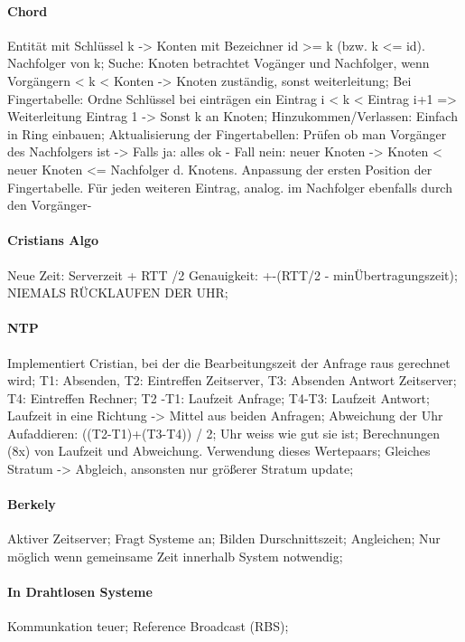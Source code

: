 \documentclass[pagesize,11pt,a4paper]{scrartcl}
\begin{document}
\paragraph{Chord}
	Entität mit Schlüssel k -> Konten mit Bezeichner id >= k (bzw. k <= id). Nachfolger von k;
	Suche: Knoten betrachtet Vogänger und Nachfolger, wenn Vorgängern < k < Konten -> Knoten zuständig, sonst weiterleitung;
	Bei Fingertabelle: Ordne Schlüssel bei einträgen ein Eintrag i < k < Eintrag i+1 => Weiterleitung Eintrag 1 -> Sonst k an Knoten;
	Hinzukommen/Verlassen: Einfach in Ring einbauen; Aktualisierung der Fingertabellen: Prüfen ob man Vorgänger des Nachfolgers ist ->
		Falls ja: alles ok -
		Fall nein: neuer Knoten -> Knoten < neuer Knoten <= Nachfolger d. Knotens. Anpassung der ersten Position der Fingertabelle. Für jeden weiteren Eintrag, analog. im Nachfolger ebenfalls durch den Vorgänger-

\paragraph*{Cristians Algo}
	Neue Zeit: Serverzeit + RTT /2  Genauigkeit: +-(RTT/2 - minÜbertragungszeit);
	NIEMALS RÜCKLAUFEN DER UHR;

\paragraph*{NTP}
	Implementiert Cristian, bei der die Bearbeitungszeit der Anfrage raus gerechnet wird;
	T1: Absenden, T2: Eintreffen Zeitserver, T3: Absenden Antwort Zeitserver; T4: Eintreffen Rechner;
	T2 -T1: Laufzeit Anfrage; T4-T3: Laufzeit Antwort;
	Laufzeit in eine Richtung -> Mittel aus beiden Anfragen;
	Abweichung der Uhr Aufaddieren: ((T2-T1)+(T3-T4)) / 2;
	Uhr weiss wie gut sie ist;
	Berechnungen (8x) von Laufzeit und Abweichung. Verwendung dieses Wertepaars;
	Gleiches Stratum -> Abgleich, ansonsten nur größerer Stratum update;

\paragraph*{Berkely}
	Aktiver Zeitserver; Fragt Systeme an; Bilden Durschnittszeit; Angleichen;
	Nur möglich wenn gemeinsame Zeit innerhalb System notwendig;

\paragraph*{In Drahtlosen Systeme}
	Kommunkation teuer; Reference Broadcast (RBS);
\end{document}
